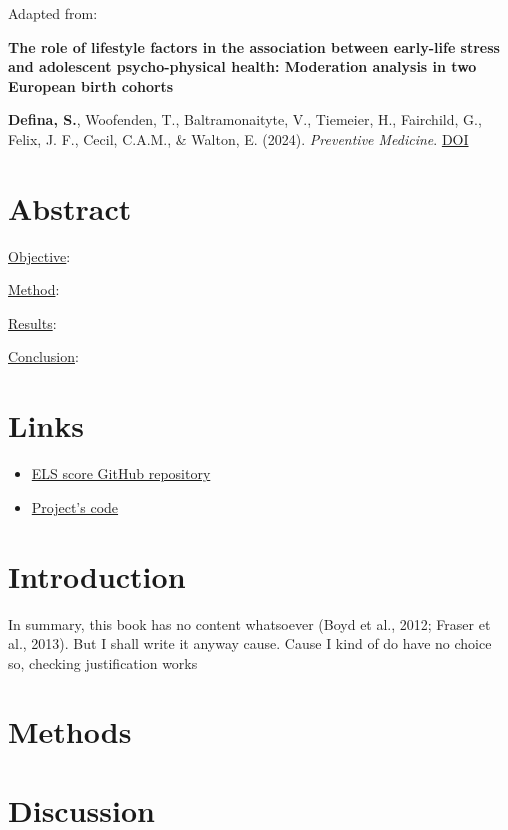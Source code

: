 \documentclass[
  letterpaper,
  DIV=11,
  numbers=noendperiod]{scrreport}
\providecommand{\tightlist}{%
  \setlength{\itemsep}{0pt}\setlength{\parskip}{0pt}}\usepackage{longtable,booktabs,array}
\begin{document}
Adapted from:

\textbf{The role of lifestyle factors in the association between
early-life stress and adolescent psycho-physical health: Moderation
analysis in two European birth cohorts}

\textbf{Defina, S.}, Woofenden, T., Baltramonaityte, V., Tiemeier, H.,
Fairchild, G., Felix, J. F., Cecil, C.A.M., \& Walton, E. (2024).
\emph{Preventive Medicine}.
\href{https://doi.org/10.1016/j.ypmed.2024.107926}{DOI}

\section*{Abstract}\label{abstract-1}


\ul{Objective}:

\ul{Method}:

\ul{Results}:

\ul{Conclusion}:

\newpage

\section*{Links}\label{links-1}


\begin{itemize}
\tightlist
\item
  \href{__els_repo__}{ELS score GitHub repository}
\item
  \href{__project_repo__}{Project's code}
\end{itemize}

\newpage

\section{Introduction}\label{introduction-1}

In summary, this book has no content whatsoever (Boyd et al., 2012;
Fraser et al., 2013). But I shall write it anyway cause. Cause I kind of
do have no choice so, checking justification works

\section{Methods}\label{methods-1}

\section{Discussion}\label{discussion-1}
\end{document}
